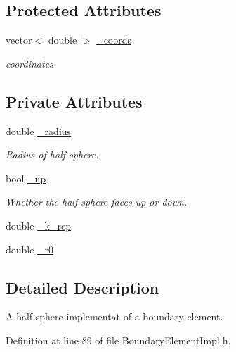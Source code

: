 \subsection*{Protected Attributes}
\begin{DoxyCompactItemize}
\item 
vector$<$ double $>$ \hyperlink{classBoundaryElement_ab51302e10e3e2def98438234ba5bf801}{\+\_\+coords}
\begin{DoxyCompactList}\small\item\em coordinates \end{DoxyCompactList}\end{DoxyCompactItemize}
\subsection*{Private Attributes}
\begin{DoxyCompactItemize}
\item 
double \hyperlink{classHalfSphereZBoundaryElement_ad1fff310ac2c3f221a8ab7393dc23b69}{\+\_\+radius}
\begin{DoxyCompactList}\small\item\em Radius of half sphere. \end{DoxyCompactList}\item 
bool \hyperlink{classHalfSphereZBoundaryElement_a3251d9e34c161076f9324dc3f2477720}{\+\_\+up}
\begin{DoxyCompactList}\small\item\em Whether the half sphere faces up or down. \end{DoxyCompactList}\item 
double \hyperlink{classHalfSphereZBoundaryElement_aaafd14a29987646f9537a7248ba6291b}{\+\_\+k\+\_\+rep}
\item 
double \hyperlink{classHalfSphereZBoundaryElement_afa790cdbea557aa8615188211acaedce}{\+\_\+r0}
\end{DoxyCompactItemize}


\subsection{Detailed Description}
A half-\/sphere implementat of a boundary element. 

Definition at line 89 of file Boundary\+Element\+Impl.\+h.



